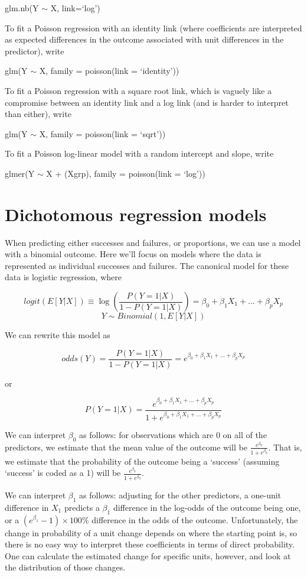 \documentclass[
  letterpaper,
  DIV=11,
  numbers=noendperiod]{scrreprt}
\begin{document}
glm.nb(Y \(\sim\) X, link=`log')

To fit a Poisson regression with an identity link (where coefficients
are interpreted as expected differences in the outcome associated with
unit differences in the predictor), write

glm(Y \(\sim\) X, family = poisson(link = `identity'))

To fit a Poisson regression with a square root link, which is vaguely
like a compromise between an identity link and a log link (and is harder
to interpret than either), write

glm(Y \(\sim\) X, family = poisson(link = `sqrt'))

To fit a Poisson log-linear model with a random intercept and slope,
write

glmer(Y \(\sim\) X + (X\textbar grp), family = poisson(link = `log'))

\hypertarget{dichotomous-regression-models}{%
\section{Dichotomous regression
models}\label{dichotomous-regression-models}}

When predicting either successes and failures, or proportions, we can
use a model with a binomial outcome. Here we'll focus on models where
the data is represented as individual successes and failures. The
canonical model for these data is logistic regression, where

\[logit(E[Y|X]) \equiv \log\left(\frac{P(Y=1|X)}{1-P(Y=1|X)}\right) = \beta_0 + \beta_1X_1 + ... + \beta_pX_p\]
\[Y \sim Binomial(1, E[Y|X])\]

We can rewrite this model as

\[odds(Y) = \frac{P(Y=1|X)}{1-P(Y=1|X)} = e^{\beta_0 + \beta_1X_1 + ... + \beta_pX_p}\]

or

\[P(Y=1|X) = \frac{e^{\beta_0 + \beta_1X_1 + ... + \beta_pX_p}}{1 + e^{\beta_0 + \beta_1X_1 + ... + \beta_pX_p}}\]

We can interpret \(\beta_0\) as follows: for observations which are 0 on
all of the predictors, we estimate that the mean value of the outcome
will be \(\frac{e^{\beta_0}}{1 + e^{\beta_0}}\). That is, we estimate
that the probability of the outcome being a `success' (assuming
`success' is coded as a 1) will be
\(\frac{e^{\beta_0}}{1 + e^{\beta_0}}\).

We can interpret \(\beta_1\) as follows: adjusting for the other
predictors, a one-unit difference in \(X_1\) predicts a \(\beta_1\)
difference in the log-odds of the outcome being one, or a
\((e^{\beta_1}-1)\times100\%\) difference in the odds of the outcome.
Unfortunately, the change in probability of a unit change depends on
where the starting point is, so there is no easy way to interpret these
coefficients in terms of direct probability. One can calculate the
estimated change for specific units, however, and look at the
distribution of those changes.
\end{document}
